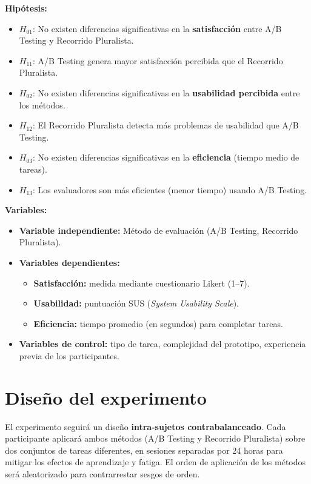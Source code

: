 \documentclass[a4paper,12pt]{report}
\begin{document}
\textbf{Hipótesis:}
\begin{itemize}
    \item $H_{01}$: No existen diferencias significativas en la \textbf{satisfacción} entre A/B Testing y Recorrido Pluralista.  
    \item $H_{11}$: A/B Testing genera mayor satisfacción percibida que el Recorrido Pluralista.
    \item $H_{02}$: No existen diferencias significativas en la \textbf{usabilidad percibida} entre los métodos.  
    \item $H_{12}$: El Recorrido Pluralista detecta más problemas de usabilidad que A/B Testing.
    \item $H_{03}$: No existen diferencias significativas en la \textbf{eficiencia} (tiempo medio de tareas).  
    \item $H_{13}$: Los evaluadores son más eficientes (menor tiempo) usando A/B Testing.
\end{itemize}

\textbf{Variables:}
\begin{itemize}
    \item \textbf{Variable independiente:} Método de evaluación (A/B Testing, Recorrido Pluralista).
    \item \textbf{Variables dependientes:}
    \begin{itemize}
        \item \textbf{Satisfacción:} medida mediante cuestionario Likert (1--7).
        \item \textbf{Usabilidad:} puntuación SUS (\textit{System Usability Scale}).
        \item \textbf{Eficiencia:} tiempo promedio (en segundos) para completar tareas.
    \end{itemize}
    \item \textbf{Variables de control:} tipo de tarea, complejidad del prototipo, experiencia previa de los participantes.
\end{itemize}

\section{Diseño del experimento}
El experimento seguirá un diseño \textbf{intra-sujetos contrabalanceado}. Cada participante aplicará ambos métodos (A/B Testing y Recorrido Pluralista) sobre dos conjuntos de tareas diferentes, en sesiones separadas por 24 horas para mitigar los efectos de aprendizaje y fatiga.  
El orden de aplicación de los métodos será aleatorizado para contrarrestar sesgos de orden.
\end{document}
